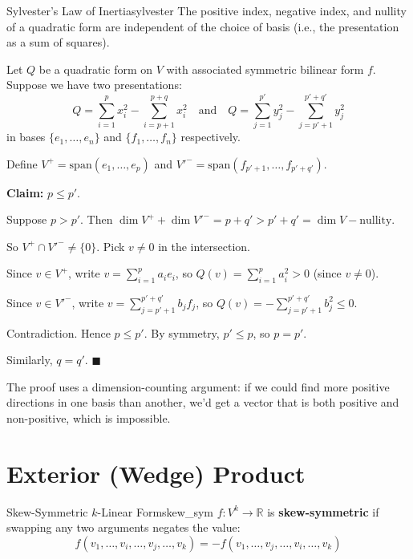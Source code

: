 \documentclass[11pt, letterpaper, openany]{book}
\renewenvironment{proof}[1][\proofname]{%
  \tcolorbox[blanker, breakable, left=1em,
    before skip=1em, after skip=1em,
    borderline west={2pt}{0pt}{MagicTeal!50},
    colback=MagicCream,
    before upper={\textcolor{MagicTeal}{\sffamily\bfseries #1.}\space}
  ]%
}{%
  \hfill\textcolor{MagicTeal}{\ensuremath{\blacksquare}}\endtcolorbox%
}
\begin{document}
\begin{thm}{Sylvester's Law of Inertia}{sylvester}
The positive index, negative index, and nullity of a quadratic form are independent of the choice of basis (i.e., the presentation as a sum of squares).
\end{thm}

\begin{proof}
Let $Q$ be a quadratic form on $V$ with associated symmetric bilinear form $f$. Suppose we have two presentations:
\[Q = \sum_{i=1}^{p} x_i^2 - \sum_{i=p+1}^{p+q} x_i^2 \quad \text{and} \quad Q = \sum_{j=1}^{p'} y_j^2 - \sum_{j=p'+1}^{p'+q'} y_j^2\]
in bases $\{e_1, \ldots, e_n\}$ and $\{f_1, \ldots, f_n\}$ respectively.

Define $V^+ = \text{span}(e_1, \ldots, e_p)$ and $V'^- = \text{span}(f_{p'+1}, \ldots, f_{p'+q'})$.

\textbf{Claim:} $p \leq p'$.

Suppose $p > p'$. Then $\dim V^+ + \dim V'^- = p + q' > p' + q' = \dim V - \text{nullity}$.

So $V^+ \cap V'^- \neq \{0\}$. Pick $v \neq 0$ in the intersection.

Since $v \in V^+$, write $v = \sum_{i=1}^p a_i e_i$, so $Q(v) = \sum_{i=1}^p a_i^2 > 0$ (since $v \neq 0$).

Since $v \in V'^-$, write $v = \sum_{j=p'+1}^{p'+q'} b_j f_j$, so $Q(v) = -\sum_{j=p'+1}^{p'+q'} b_j^2 \leq 0$.

Contradiction. Hence $p \leq p'$. By symmetry, $p' \leq p$, so $p = p'$.

Similarly, $q = q'$.
\end{proof}

\begin{remark}
The proof uses a dimension-counting argument: if we could find more positive directions in one basis than another, we'd get a vector that is both positive and non-positive, which is impossible.
\end{remark}

\section{Exterior (Wedge) Product}

\begin{defn}{Skew-Symmetric $k$-Linear Form}{skew_sym}
$f: V^k \to \mathbb{R}$ is \textbf{skew-symmetric} if swapping any two arguments negates the value:
\[
f(v_1, \ldots, v_i, \ldots, v_j, \ldots, v_k) = -f(v_1, \ldots, v_j, \ldots, v_i, \ldots, v_k)
\]
\end{defn}
\end{document}
